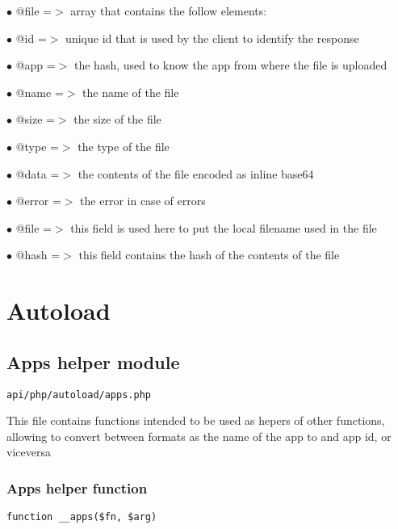 \documentclass[a4paper]{article}
\begin{document}
\begin{compactitem}
\item[\color{myblue}$\bullet$] @file  =$>$ array that contains the follow elements:
\item[\color{myblue}$\bullet$] @id    =$>$ unique id that is used by the client to identify the response
\item[\color{myblue}$\bullet$] @app   =$>$ the hash, used to know the app from where the file is uploaded
\item[\color{myblue}$\bullet$] @name  =$>$ the name of the file
\item[\color{myblue}$\bullet$] @size  =$>$ the size of the file
\item[\color{myblue}$\bullet$] @type  =$>$ the type of the file
\item[\color{myblue}$\bullet$] @data  =$>$ the contents of the file encoded as inline base64
\item[\color{myblue}$\bullet$] @error =$>$ the error in case of errors
\item[\color{myblue}$\bullet$] @file  =$>$ this field is used here to put the local filename used in the file
\item[\color{myblue}$\bullet$] @hash  =$>$ this field contains the hash of the contents of the file
\end{compactitem}


\hypertarget{toc13}{}
\section{Autoload}

\hypertarget{toc14}{}
\subsection{Apps helper module}

\begin{lstlisting}
api/php/autoload/apps.php
\end{lstlisting}

This file contains functions intended to be used as hepers of other functions, allowing to convert
between formats as the name of the app to and app id, or viceversa

\hypertarget{toc15}{}
\subsubsection{Apps helper function}

\begin{lstlisting}
function __apps($fn, $arg)
\end{lstlisting}
\end{document}
